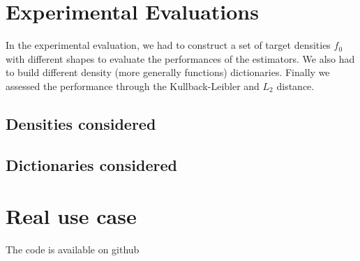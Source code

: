 \section{Experimental Evaluations}

In the experimental evaluation, we had to construct a set of target densities $f_0$ with different shapes to evaluate the performances of the estimators. We also had to build different density (more generally functions) dictionaries. Finally we assessed the performance through the Kullback-Leibler and $L_2$ distance.

\subsection{Densities considered}

\subsection{Dictionaries considered}
\section{Real use case}

The code is available on github
